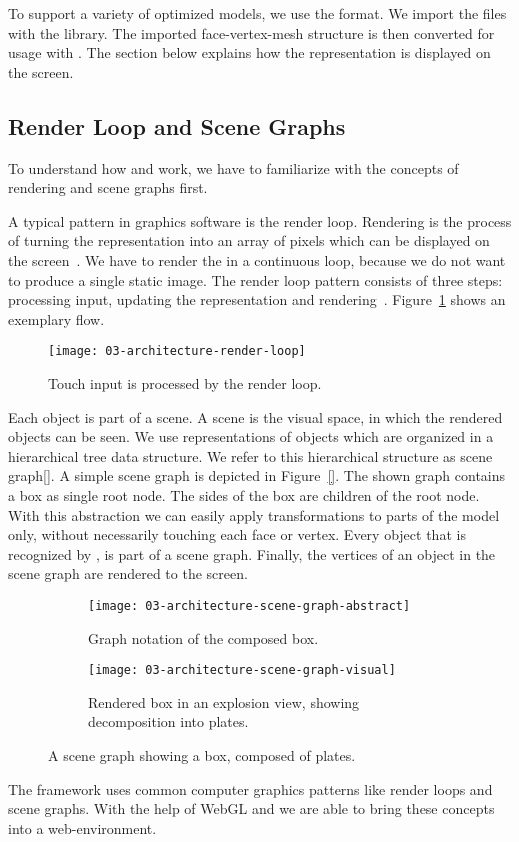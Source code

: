 \documentclass[../../ClassicThesis.tex]{subfiles}
\begin{document}
To support a variety of {\threedprinter} optimized models, we use the
{\stlfile} format. We import the files with the {\meshlib} library.
The imported face-vertex-mesh structure is then converted for usage
with {\threejs}. The section below explains how the {\threejs}
representation is displayed on the screen.

\subsection{Render Loop and Scene Graphs}
\label{sub:render-and-graph}

To understand how {\convertify} and {\platener} work, we have to
familiarize with the concepts of rendering and scene graphs first.

A typical pattern in graphics software is the render loop.
Rendering is the process of turning the {\threedmodel}
representation into an array of pixels which can be
displayed on the screen~\cite[p.~2]{intro-cg}. We have to
render the {\threedmodel} in a continuous loop, because we
do not want to produce a single static image. The render
loop pattern consists of three steps: processing input,
updating the {\threedmodel} representation and
rendering~\cite{gamedev-gameloop}.
Figure~\ref{fig:render-loop} shows an exemplary flow.

\begin{figure}[h]
  \centering
  \texttt{[image: 03-architecture-render-loop]}
  \caption{Touch input is processed by the render loop.}
  \label{fig:render-loop}
\end{figure}

Each object is part of a scene. A scene is the visual space, in which
the rendered objects can be seen. We use representations of objects
which are organized in a hierarchical tree data structure. We refer to
this hierarchical structure as scene graph\ref{}. A simple scene graph is depicted in
Figure~\ref{}. The shown graph contains a box as single root node. The
sides of the box are children of the root node. With this abstraction
we can easily apply transformations to parts of the model only,
without necessarily touching each face or vertex. Every object that
is recognized by {\convertify}, is part of a scene graph. Finally, the
vertices of an object in the scene graph are rendered to the screen.

\begin{figure}[H]
  \centering
  \begin{subfigure}[b]{0.49\textwidth}
    \centering
    \texttt{[image: 03-architecture-scene-graph-abstract]}
    \caption{Graph notation of the composed box.}
    \label{fig:scene-graph:abstract}
  \end{subfigure}
  \begin{subfigure}[b]{0.49\textwidth}
    \centering
    \texttt{[image: 03-architecture-scene-graph-visual]}
    \caption{Rendered box in an explosion view, showing decomposition into plates.}
    \label{fig:scene-graph:visual}
  \end{subfigure}
  \caption{A scene graph showing a box, composed of plates.}
  \label{fig:scene-graph}
\end{figure}


The framework {\convertify} uses common computer graphics
patterns like render loops and scene graphs. With the help
of WebGL and {\threejs} we are able to bring these concepts
into a web-environment.
\end{document}
